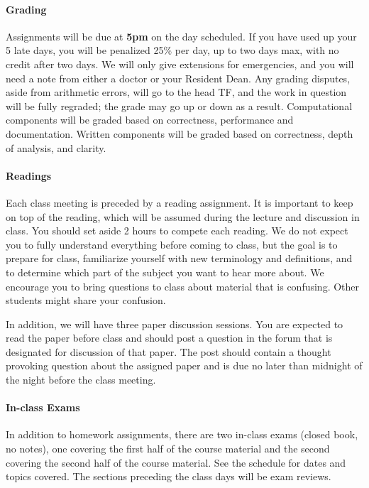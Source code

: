 \documentclass[11pt]{article}
\begin{document}
\paragraph{Grading} Assignments will be due at \textbf{5pm} on the day
scheduled. If you have used up your 5 late days, you will be penalized
25\% per day, up to two days max, with no credit after two days. We
will only give extensions for emergencies, and you will need a note
from either a doctor or your Resident Dean. Any grading disputes,
aside from arithmetic errors, will go to the head TF, and the work in
question will be fully regraded; the grade may go up or down as a
result. Computational components will be graded based on correctness,
performance and documentation.  Written components will be graded
based on correctness, depth of analysis, and clarity.

\paragraph{Readings}

Each class meeting is preceded by a reading assignment. It is
important to keep on top of the reading, which will be assumed during
the lecture and discussion in class. You should set aside 2 hours to
compete each reading. We do not expect you to fully understand
everything before coming to class, but the goal is to prepare for
class, familiarize yourself with new terminology and definitions, and
to determine which part of the subject you want to hear more about.
We encourage you to bring questions to class about material that is
confusing.  Other students might share your confusion.

In addition, we will have three paper discussion sessions. You are
expected to read the paper before class and should post a question in
the forum that is designated for discussion of that paper. The post
should contain a thought provoking question about the assigned paper
and is due no later than midnight of the night before the class
meeting.


\paragraph{In-class Exams}

In addition to homework assignments, there are two in-class exams
(closed book, no notes), one covering the first half of the course
material and the second covering the second half of the course
material. See the schedule for dates and topics covered. The sections
preceding the class days will be exam reviews.
\end{document}
